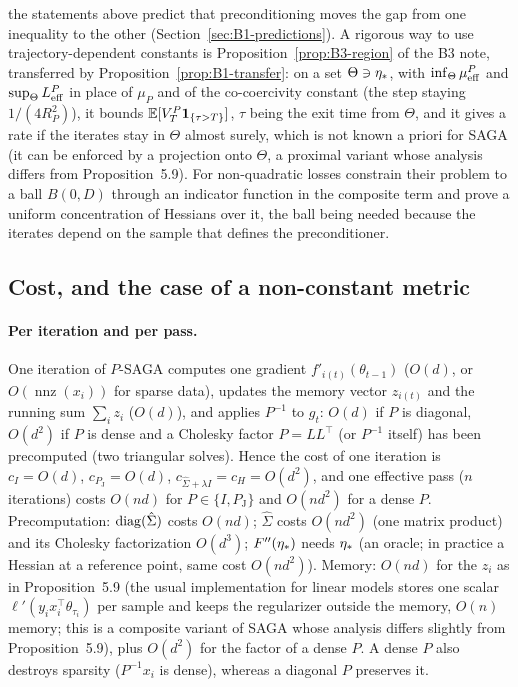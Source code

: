 the statements above predict that preconditioning moves the gap from one inequality to the other
(Section~\ref{sec:B1-predictions}). A rigorous way to use trajectory-dependent constants is
Proposition~\ref{prop:B3-region} of the B3 note, transferred by Proposition~\ref{prop:B1-transfer}: on a set
$\Theta\ni\eta_\ast$, with $\inf_\Theta\mu_{\mathrm{eff}}^P$ and $\sup_\Theta L_{\mathrm{eff}}^P$ in place of $\mu_P$ and of the
co-coercivity constant (the step staying $1/(4R_P^2)$), it bounds $\mathbb{E}[V_T^P\mathbf{1}_{\{\tau>T\}}]$, $\tau$ being the
exit time from $\Theta$, and it gives a rate if the iterates stay in $\Theta$ almost surely, which is not known
a priori for SAGA (it can be enforced by a projection onto $\Theta$, a proximal variant whose analysis differs
from Proposition~5.9). For non-quadratic losses \cite[Sec.~4.2]{hendrikx2020statistically} constrain their
problem to a ball $B(0,D)$ through an indicator function in the composite term and prove a uniform
concentration of Hessians over it, the ball being needed because the iterates depend on the sample that
defines the preconditioner.

\subsection{Cost, and the case of a non-constant metric}
\label{sec:B1-cost}

\paragraph{Per iteration and per pass.}
One iteration of $P$-SAGA computes one gradient $f'_{i(t)}(\theta_{t-1})$ ($O(d)$, or
$O(\operatorname{nnz}(x_i))$ for sparse data), updates the memory vector $z_{i(t)}$ and the running sum
$\sum_iz_i$ ($O(d)$), and applies $P^{-1}$ to $g_t$: $O(d)$ if $P$ is diagonal, $O(d^2)$ if $P$ is dense
and a Cholesky factor $P=LL^\top$ (or $P^{-1}$ itself) has been precomputed (two triangular solves).
Hence the cost of one iteration is $c_I=O(d)$, $c_{P_{\mathrm J}}=O(d)$, $c_{\hat\Sigma+\lambda I}=c_H=O(d^2)$, and one
effective pass ($n$ iterations) costs $O(nd)$ for $P\in\{I,P_{\mathrm J}\}$ and $O(nd^2)$ for a dense $P$.
Precomputation: $\operatorname{diag}(\hat\Sigma)$ costs $O(nd)$; $\hat\Sigma$ costs $O(nd^2)$ (one matrix product) and its
Cholesky factorization $O(d^3)$; $F''(\eta_\ast)$ needs $\eta_\ast$ (an oracle; in practice a Hessian at a
reference point, same cost $O(nd^2)$). Memory: $O(nd)$ for the $z_i$ as in Proposition~5.9 (the usual
implementation for linear models stores one scalar $\ell'(y_ix_i^\top\theta_{\tau_i})$ per sample and keeps
the regularizer outside the memory, $O(n)$ memory; this is a composite variant of SAGA
\cite{defazio2014saga} whose analysis differs slightly from Proposition~5.9), plus $O(d^2)$ for the factor
of a dense $P$. A dense $P$ also destroys sparsity ($P^{-1}x_i$ is dense), whereas a diagonal $P$ preserves
it.

